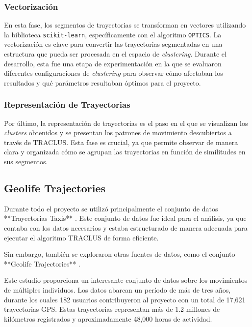 \subsubsection{Vectorización}

En esta fase, los segmentos de trayectorias se transforman en vectores utilizando la biblioteca \texttt{scikit-learn}, específicamente con el algoritmo \texttt{OPTICS}. La vectorización es clave para convertir las trayectorias segmentadas en una estructura que pueda ser procesada en el espacio de \textit{clustering}. Durante el desarrollo, esta fue una etapa de experimentación en la que se evaluaron diferentes configuraciones de \textit{clustering} para observar cómo afectaban los resultados y qué parámetros resultaban óptimos para el proyecto.

\subsubsection{Representación de Trayectorias}

Por último, la representación de trayectorias es el paso en el que se visualizan los \textit{clusters} obtenidos y se presentan los patrones de movimiento descubiertos a través de TRACLUS. Esta fase es crucial, ya que permite observar de manera clara y organizada cómo se agrupan las trayectorias en función de similitudes en sus segmentos.

\subsection{Geolife Trajectories}

Durante todo el proyecto se utilizó principalmente el conjunto de datos **Trayectorias Taxis** \cite{trayectorias_taxis}. Este conjunto de datos fue ideal para el análisis, ya que contaba con los datos necesarios y estaba estructurado de manera adecuada para ejecutar el algoritmo TRACLUS de forma eficiente. 

Sin embargo, también se exploraron otras fuentes de datos, como el conjunto **Geolife Trajectories** \cite{geolife_trajectories}. 

Este estudio proporciona un interesante conjunto de datos sobre los movimientos de múltiples individuos. Los datos abarcan un período de más de tres años, durante los cuales 182 usuarios contribuyeron al proyecto con un total de 17,621 trayectorias GPS. Estas trayectorias representan más de 1.2 millones de kilómetros registrados y aproximadamente 48,000 horas de actividad.

